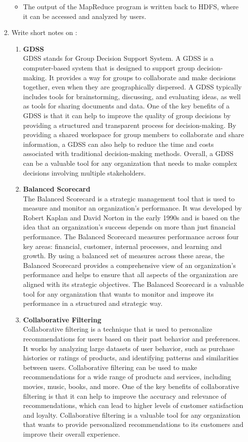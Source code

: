 \documentclass[12pt]{article}
\begin{document}
\begin{enumerate}
\begin{itemize}
            \item The output of the MapReduce program is written back to HDFS, where it can be accessed and analyzed by users.
            \end{itemize}
    \item{Write short notes on : }
    \begin{enumerate}
        \item {\bfseries GDSS\\}
        GDSS stands for Group Decision Support System. A GDSS is a computer-based system that is designed to support group decision-making. It provides a way for groups to collaborate and make decisions together, even when they are geographically dispersed. A GDSS typically includes tools for brainstorming, discussing, and evaluating ideas, as well as tools for sharing documents and data. One of the key benefits of a GDSS is that it can help to improve the quality of group decisions by providing a structured and transparent process for decision-making. By providing a shared workspace for group members to collaborate and share information, a GDSS can also help to reduce the time and costs associated with traditional decision-making methods. Overall, a GDSS can be a valuable tool for any organization that needs to make complex decisions involving multiple stakeholders.
        \item {\bfseries Balanced Scorecard \\}
        The Balanced Scorecard is a strategic management tool that is used to measure and monitor an organization's performance. It was developed by Robert Kaplan and David Norton in the early 1990s and is based on the idea that an organization's success depends on more than just financial performance. The Balanced Scorecard measures performance across four key areas: financial, customer, internal processes, and learning and growth. By using a balanced set of measures across these areas, the Balanced Scorecard provides a comprehensive view of an organization's performance and helps to ensure that all aspects of the organization are aligned with its strategic objectives. The Balanced Scorecard is a valuable tool for any organization that wants to monitor and improve its performance in a structured and strategic way.
        \item {\bfseries Collaborative Filtering \\}
        Collaborative filtering is a technique that is used to personalize recommendations for users based on their past behavior and preferences. It works by analyzing large datasets of user behavior, such as purchase histories or ratings of products, and identifying patterns and similarities between users. Collaborative filtering can be used to make recommendations for a wide range of products and services, including movies, music, books, and more. One of the key benefits of collaborative filtering is that it can help to improve the accuracy and relevance of recommendations, which can lead to higher levels of customer satisfaction and loyalty. Collaborative filtering is a valuable tool for any organization that wants to provide personalized recommendations to its customers and improve their overall experience.

\end{enumerate}
\end{enumerate}
\end{document}
